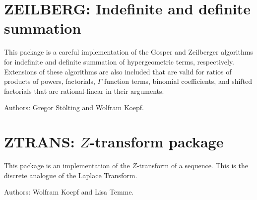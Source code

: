 \section{ZEILBERG: Indefinite and definite summation}


This package is a careful implementation of the Gosper and Zeilberger
algorithms for indefinite and definite summation of hypergeometric terms,
respectively.  Extensions of these algorithms are also included that are
valid for ratios of products of powers, factorials, $\Gamma$ function
terms, binomial coefficients, and shifted factorials that are
rational-linear in their arguments.

Authors: Gregor St\"olting and Wolfram Koepf.


\newpage

\section{ZTRANS: \texorpdfstring{$Z$}{\textit{Z}}-transform package}


This package is an implementation of the $Z$-transform of a sequence.
This is the discrete analogue of the Laplace Transform.

Authors: Wolfram Koepf and Lisa Temme.


\let\sectionmark=\origsectionmark
